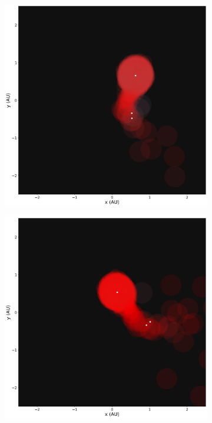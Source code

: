 \begin{figure}[H]
\begin{subfigure}[b]{0.47\textwidth}
        \includegraphics[width=\textwidth]{Thesis/graphs/snapshot_0023150.png}
    \end{subfigure}
    \hfill
    \begin{subfigure}[b]{0.47\textwidth}  
        \centering 
        \includegraphics[width=\textwidth]{Thesis/graphs/snapshot_0023320.png}

\end{subfigure}
\end{figure}
